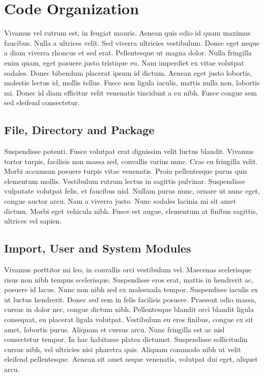 \section{Code Organization}
Vivamus vel rutrum est, in feugiat mauris. Aenean quis odio id quam maximus faucibus. Nulla a ultrices velit. Sed viverra ultricies vestibulum. Donec eget neque a diam viverra rhoncus et sed erat. Pellentesque ut magna dolor. Nulla fringilla enim quam, eget posuere justo tristique eu. Nam imperdiet ex vitae volutpat sodales. Donec bibendum placerat ipsum id dictum. Aenean eget justo lobortis, molestie lectus id, mollis tellus. Fusce non ligula iaculis, mattis nulla non, lobortis mi. Donec id diam efficitur velit venenatis tincidunt a eu nibh. Fusce congue sem sed eleifend consectetur.

\subsection{File, Directory and Package}
Suspendisse potenti. Fusce volutpat erat dignissim velit luctus blandit. Vivamus tortor turpis, facilisis non massa sed, convallis varius nunc. Cras eu fringilla velit. Morbi accumsan posuere turpis vitae venenatis. Proin pellentesque purus quis elementum mollis. Vestibulum rutrum lectus in sagittis pulvinar. Suspendisse vulputate volutpat felis, et faucibus nisl. Nullam purus nunc, ornare ut nunc eget, congue auctor arcu. Nam a viverra justo. Nunc sodales lacinia mi sit amet dictum. Morbi eget vehicula nibh. Fusce est augue, elementum at finibus sagittis, ultrices vel sapien.

\subsection{Import, User and System Modules}
Vivamus porttitor mi leo, in convallis orci vestibulum vel. Maecenas scelerisque risus non nibh tempus scelerisque. Suspendisse eros erat, mattis in hendrerit ac, posuere id lacus. Nunc non nibh sed ex malesuada tempor. Suspendisse iaculis ex ut luctus hendrerit. Donec sed sem in felis facilisis posuere. Praesent odio massa, cursus in dolor nec, congue dictum nibh. Pellentesque blandit orci blandit ligula consequat, eu placerat ligula volutpat. Vestibulum eu eros finibus, congue ex sit amet, lobortis purus. Aliquam et cursus arcu. Nunc fringilla est ac nisl consectetur tempor. In hac habitasse platea dictumst. Suspendisse sollicitudin cursus nibh, vel ultricies nisi pharetra quis. Aliquam commodo nibh ut velit eleifend pellentesque. Aenean sit amet neque venenatis, volutpat dui eget, aliquet arcu.


